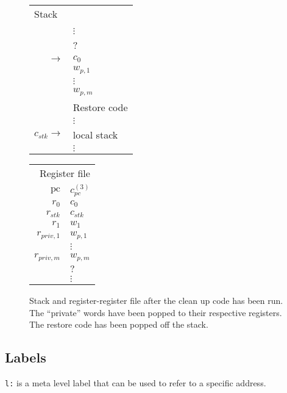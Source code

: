\documentclass[a4paper]{article}
\newcommand{\var}[1]{\mathit{#1}}
\newcommand{\pc}{\mathit{pc}}
\newcommand{\pcreg}{\mathrm{pc}}
\newcommand{\stk}{\var{stk}}
\begin{document}
\begin{figure}
  \label{fig:stack-after-restore-code}
  \centering
  \begin{tabular}[!h]{r | >{\raggedright\arraybackslash}p{3cm} |}
    \multicolumn{2}{l}{Stack} \\
    \cline{2-2}
 & \\
 & $\vdots$\\
    \cline{2-2}
 & ? \\
    \cline{2-2}
    $ \rightarrow$  & $c_0$ \\
    \cline{2-2}
 & $w_{p,1}$ \\
    \cline{2-2}
 & $\vdots$ \\
    \cline{2-2}
 & $w_{p,m}$ \\
    \cline{2-2}
 & Restore code \\
 & $\vdots$\\
    \cline{2-2}
    $c_\stk \rightarrow$  & local stack\\
 & $\vdots$\\
    \cline{2-2}
  \end{tabular}
  \hspace{1cm}
  \begin{tabular}{r | >{\centering\arraybackslash}p{0.75cm} |}
    \multicolumn{2}{r}{Register file} \\
    \cline{2-2}
    $\pcreg$ & $c_\pc^{(3)}$\\
    \cline{2-2}
    $r_0$  &  $c_0$ \\
    \cline{2-2}
    $r_{\var{stk}}$  & $c_{\var{stk}}$ \\
    \cline{2-2}
    $r_1$ & $w_1$ \\
    \cline{2-2}
    $r_{\var{priv},1}$ & $w_{p,1}$\\
    \cline{2-2}
             & $\vdots$ \\
    \cline{2-2}
    $r_{\var{priv},m}$ & $w_{p,m}$ \\
    \cline{2-2}
             & $?$ \\
    \cline{2-2}
             & $\vdots$ \\
    \cline{2-2}
  \end{tabular}
  \caption{ Stack and register-register file after the clean up code has been run. The ``private'' words have been popped to their respective registers. The restore code has been popped off the stack. }
\end{figure}


\subsection{Labels}
\texttt{l:} is a meta level label that can be used to refer to a specific address.
\end{document}
